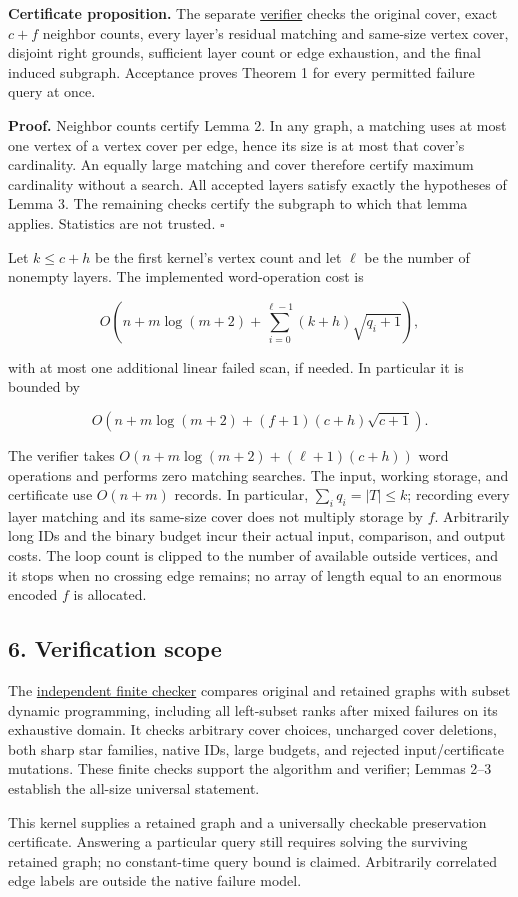\textbf{Certificate proposition.} The separate \href{https://github.com/icekylinx/algorithm-frontier/blob/main/problems/general-matching/reference/verify_failure_kernel.py}{verifier} checks the original cover, exact \(c+f\) neighbor counts, every layer's residual matching and same-size vertex cover, disjoint right grounds, sufficient layer count or edge exhaustion, and the final induced subgraph. Acceptance proves Theorem 1 for every permitted failure query at once.

\textbf{Proof.} Neighbor counts certify Lemma 2. In any graph, a matching uses at most one vertex of a vertex cover per edge, hence its size is at most that cover's cardinality. An equally large matching and cover therefore certify maximum cardinality without a search. All accepted layers satisfy exactly the hypotheses of Lemma 3. The remaining checks certify the subgraph to which that lemma applies. Statistics are not trusted. \hfill\(\square\)

Let \(k\leq c+h\) be the first kernel's vertex count and let \(\ell\) be the number of nonempty layers. The implemented word-operation cost is

\[
O\!\left(n+m\log(m+2)+
       \sum_{i=0}^{\ell-1}(k+h)\sqrt{q_i+1}\right),
\]

with at most one additional linear failed scan, if needed. In particular it is bounded by

\[
O\!\left(n+m\log(m+2)+(f+1)(c+h)\sqrt{c+1}\right).
\]

The verifier takes \(O(n+m\log(m+2)+(\ell+1)(c+h))\) word operations and performs zero matching searches. The input, working storage, and certificate use \(O(n+m)\) records. In particular, \(\sum_iq_i=|T|\leq k\); recording every layer matching and its same-size cover does not multiply storage by \(f\). Arbitrarily long IDs and the binary budget incur their actual input, comparison, and output costs. The loop count is clipped to the number of available outside vertices, and it stops when no crossing edge remains; no array of length equal to an enormous encoded \(f\) is allocated.

\hypertarget{af-321c79486f-verification-scope}{%
\subsection{6. Verification scope}\label{af-321c79486f-verification-scope}}

The \href{https://github.com/icekylinx/algorithm-frontier/blob/main/problems/general-matching/verify/check_failure_kernel.py}{independent finite checker} compares original and retained graphs with subset dynamic programming, including all left-subset ranks after mixed failures on its exhaustive domain. It checks arbitrary cover choices, uncharged cover deletions, both sharp star families, native IDs, large budgets, and rejected input/certificate mutations. These finite checks support the algorithm and verifier; Lemmas 2--3 establish the all-size universal statement.

This kernel supplies a retained graph and a universally checkable preservation certificate. Answering a particular query still requires solving the surviving retained graph; no constant-time query bound is claimed. Arbitrarily correlated edge labels are outside the native failure model.
